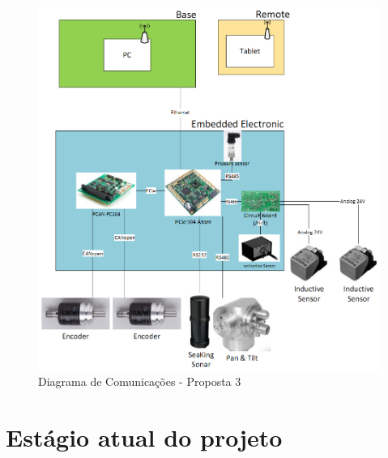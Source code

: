 \begin{figure}[H]
    \centering
    \includegraphics[width=1\columnwidth]{figs/eletronica/5.png}
    \caption{Diagrama de Comunicações - Proposta 3}
    \label{prop3}
\end{figure} 

\section{Estágio atual do projeto}

